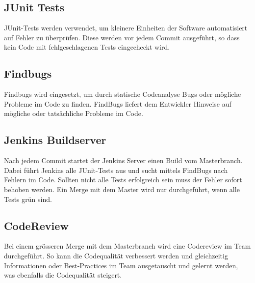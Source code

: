 \documentclass[11pt]{scrartcl}
\begin{document}
\subsection{JUnit Tests}
JUnit-Tests werden verwendet, um kleinere Einheiten der Software automatisiert auf Fehler zu überprüfen. Diese werden vor jedem Commit ausgeführt, so dass kein Code mit fehlgeschlagenen Tests eingecheckt wird.
\subsection{Findbugs}
Findbugs wird eingesetzt, um durch statische Codeanalyse Bugs oder mögliche Probleme im Code zu finden. FindBugs liefert dem Entwickler Hinweise auf mögliche oder tatsächliche Probleme im Code.
\subsection{Jenkins Buildserver}
Nach jedem Commit startet der Jenkins Server einen Build vom Masterbranch. Dabei führt Jenkins alle JUnit-Tests aus und sucht mittels FindBugs nach Fehlern im Code. Sollten nicht alle Tests erfolgreich sein muss der Fehler sofort behoben werden. Ein Merge mit dem Master wird nur durchgeführt, wenn alle Tests grün sind.
\subsection{CodeReview}
Bei einem grösseren Merge mit dem Masterbranch wird eine Codereview im Team durchgeführt. So kann die Codequalität verbessert werden und gleichzeitig Informationen oder Best-Practices im Team ausgetauscht und gelernt werden, was ebenfalls die Codequalität steigert.
\end{document}
